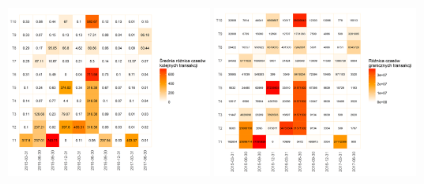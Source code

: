 \documentclass[]{beamer}
\newcommand{\sizequad}{0.40}
\begin{document}
\begin{frame}
\begin{minipage}{\textwidth}
  		 \includegraphics[width=\sizequad\textwidth]{pictures/roznica_czasow/roznica_czasow_hm.png}\quad
  		 \includegraphics[width=\sizequad\textwidth]{pictures/czas_graniczny/czas_graniczny_hm.png}
 \end{minipage} 
\end{frame}
\end{document}
